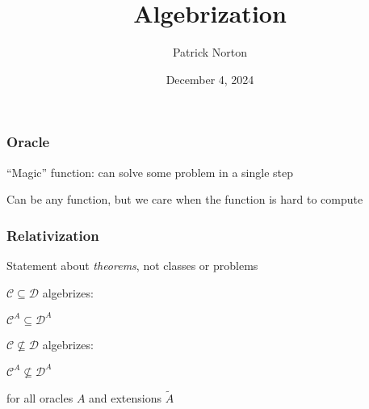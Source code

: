 \documentclass[xcolor={usenames,dvipsnames}]{beamer}
\title[Algebrization]{\bf\huge \textcolor{reedcolor}{Algebrization}}
\author{Patrick Norton}
\date{\textcolor{reedcolor}{December 4, 2024}}
\begin{document}


\begin{frame}[label=titlepage]
  \titlepage{}
\end{frame}

\usebackgroundtemplate{}

\begin{frame}
  \frametitle{Oracle}
  ``Magic'' function: can solve some problem in a single step

  \bigskip
  Can be any function, but we care when the function is hard to compute
\end{frame}

\begin{frame}
  \frametitle{Relativization}

  Statement about \emph{theorems}, not classes or problems

  \bigskip
  \begin{minipage}[t]{0.48\linewidth}
    \begin{center}
      $\mathcal{C} \subseteq \mathcal{D}$ algebrizes:

      \bigskip
      $\mathcal{C}^{A} \subseteq \mathcal{D}^{A}$
    \end{center}
  \end{minipage}\hfill
  \begin{minipage}[t]{0.48\linewidth}
      $\mathcal{C} \nsubseteq \mathcal{D}$ algebrizes:

      \bigskip
      $\mathcal{C}^{A} \nsubseteq \mathcal{D}^{A}$
  \end{minipage}

  \bigskip
  \bigskip
  for all oracles $A$ and extensions $\tilde{A}$
\end{frame}
\end{document}
